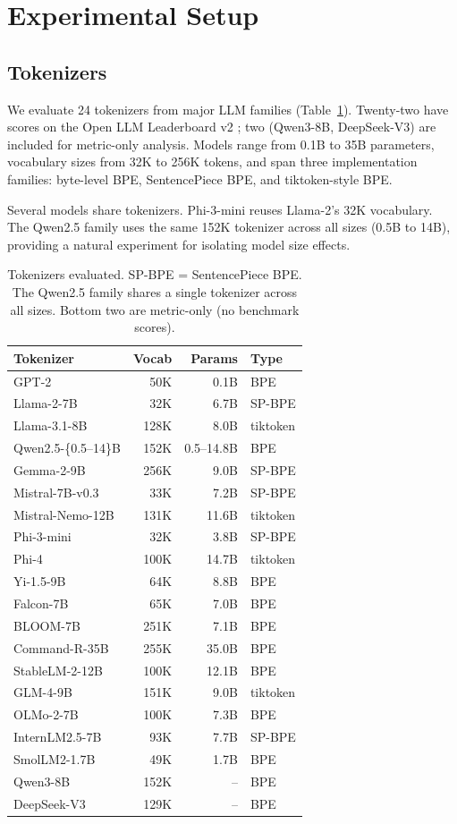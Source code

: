 \documentclass[11pt]{article}
\begin{document}
\section{Experimental Setup}

\subsection{Tokenizers}

We evaluate 24 tokenizers from major LLM families (Table~\ref{tab:tokenizers}). Twenty-two have scores on the Open LLM Leaderboard v2 \citep{fourrier2024open}; two (Qwen3-8B, DeepSeek-V3) are included for metric-only analysis. Models range from 0.1B to 35B parameters, vocabulary sizes from 32K to 256K tokens, and span three implementation families: byte-level BPE, SentencePiece BPE, and tiktoken-style BPE.

Several models share tokenizers. Phi-3-mini reuses Llama-2's 32K vocabulary. The Qwen2.5 family uses the same 152K tokenizer across all sizes (0.5B to 14B), providing a natural experiment for isolating model size effects.

\begin{table}[t]
\centering
\footnotesize
\begin{tabular}{lrrl}
\toprule
\textbf{Tokenizer} & \textbf{Vocab} & \textbf{Params} & \textbf{Type} \\
\midrule
GPT-2 & 50K & 0.1B & BPE \\
Llama-2-7B & 32K & 6.7B & SP-BPE \\
Llama-3.1-8B & 128K & 8.0B & tiktoken \\
Qwen2.5-\{0.5--14\}B & 152K & 0.5--14.8B & BPE \\
Gemma-2-9B & 256K & 9.0B & SP-BPE \\
Mistral-7B-v0.3 & 33K & 7.2B & SP-BPE \\
Mistral-Nemo-12B & 131K & 11.6B & tiktoken \\
Phi-3-mini & 32K & 3.8B & SP-BPE \\
Phi-4 & 100K & 14.7B & tiktoken \\
Yi-1.5-9B & 64K & 8.8B & BPE \\
Falcon-7B & 65K & 7.0B & BPE \\
BLOOM-7B & 251K & 7.1B & BPE \\
Command-R-35B & 255K & 35.0B & BPE \\
StableLM-2-12B & 100K & 12.1B & BPE \\
GLM-4-9B & 151K & 9.0B & tiktoken \\
OLMo-2-7B & 100K & 7.3B & BPE \\
InternLM2.5-7B & 93K & 7.7B & SP-BPE \\
SmolLM2-1.7B & 49K & 1.7B & BPE \\
\midrule
Qwen3-8B & 152K & -- & BPE \\
DeepSeek-V3 & 129K & -- & BPE \\
\bottomrule
\end{tabular}
\caption{Tokenizers evaluated. SP-BPE = SentencePiece BPE. The Qwen2.5 family shares a single tokenizer across all sizes. Bottom two are metric-only (no benchmark scores).}
\label{tab:tokenizers}
\end{table}
\end{document}
